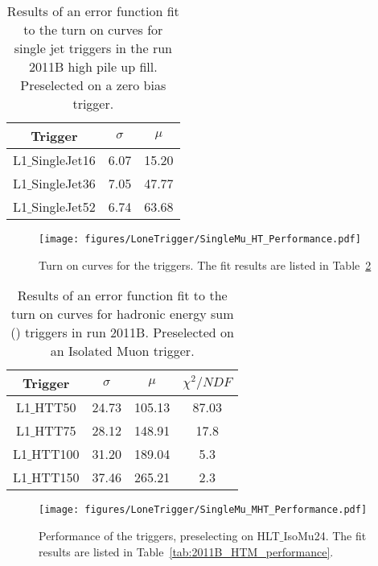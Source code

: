 \begin{table}[ht]
\begin{tabular}{|c|c|c|}
\hline
Trigger & $\sigma$ & $\mu$\\
\hline
L1$\_$SingleJet16 & 6.07 & 15.20 \\
\hline
L1$\_$SingleJet36 & 7.05 & 47.77 \\
\hline
L1$\_$SingleJet52 & 6.74 & 63.68 \\
\hline
\end{tabular}
\caption{Results of an error function fit to the turn on curves for \Lone 
single jet triggers in the run 2011B high pile up fill. Preselected on a zero
bias trigger.}
\label{tab:2011B_HighPU_NoFastJet}
\end{table}


\begin{figure}[ht]
  \centering
    \texttt{[image: figures/LoneTrigger/SingleMu\_HT\_Performance.pdf]}
  \caption{Turn on curves for the \Lone \HT triggers. The fit results are listed in Table~\ref{tab:2011B_HT_performance}}
  \label{fig:figures_SingleMu_HT_Performance}
\end{figure}

\begin{table}[ht]
 \centering
\begin{tabular}{|c|c|c|c|}
\hline
\hline
Trigger & $\sigma$ & $\mu$ & $\chi^2/NDF$\\
\hline
L1$\_$HTT50 & 24.73 & 105.13  & 87.03 \\
\hline
L1$\_$HTT75 & 28.12 & 148.91  & 17.8 \\
\hline
L1$\_$HTT100 & 31.20 & 189.04 & 5.3 \\
\hline
L1$\_$HTT150 & 37.46 & 265.21 & 2.3 \\
\hline
\hline
\end{tabular}
\caption{Results of an error function fit to the turn on curves for \Lone 
hadronic energy sum (\HT) triggers in run 2011B. Preselected on an Isolated Muon trigger.}
\label{tab:2011B_HT_performance}
\end{table}


\begin{figure}[ht]
  \centering
    \texttt{[image: figures/LoneTrigger/SingleMu\_MHT\_Performance.pdf]}
  \caption{Performance of the \Lone \HTm triggers, preselecting on 
  HLT$\_$IsoMu24. The fit results are listed in 
  Table~\ref{tab:2011B_HTM_performance}. }
  \label{fig:figures_SingleMu_MHT_Performance}
\end{figure}

